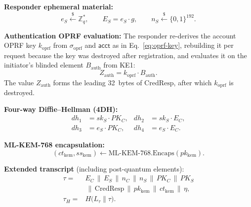 \documentclass{ieeeijc}
\newcommand{\acct}{\mathsf{acct}}
\newcommand{\sigoprf}{\sigma_{\mathrm{oprf}}}
\theoremstyle{remark}
\begin{document}
\textbf{Responder ephemeral material:}
\begin{equation}
  e_S \xleftarrow{\$} \mathbb{Z}_q^*,\qquad
  E_S = e_S \cdot g,\qquad
  n_S \xleftarrow{\$} \{0,1\}^{192}.
\end{equation}

\textbf{Authentication OPRF evaluation:} The responder re-derives the
account OPRF key $k_{\mathrm{oprf}}$ from $\sigoprf$ and $\acct$ as in
Eq.~\eqref{eq:oprf-key}, rebuilding it per request because the key was
destroyed after registration, and evaluates it on the initiator's
blinded element $B_{\mathrm{auth}}$ from KE1:
\begin{equation}
  Z_{\mathrm{auth}} = k_{\mathrm{oprf}} \cdot B_{\mathrm{auth}}.
\end{equation}
The value $Z_{\mathrm{auth}}$ forms the leading 32~bytes of
$\mathrm{CredResp}$, after which $k_{\mathrm{oprf}}$ is destroyed.

\textbf{Four-way Diffie--Hellman (4DH):}
\begin{equation}
  \begin{aligned}
    dh_1 &= sk_S \cdot PK_C, &
    dh_2 &= sk_S \cdot E_C,\\
    dh_3 &= e_S \cdot PK_C, &
    dh_4 &= e_S \cdot E_C.
  \end{aligned}
\end{equation}

\textbf{ML-KEM-768 encapsulation:}
\begin{equation}
  (ct_{\mathrm{kem}}, ss_{\mathrm{kem}})
    \leftarrow \mathrm{ML\text{-}KEM\text{-}768.Encaps}(pk_{\mathrm{kem}}).
\end{equation}

\textbf{Extended transcript} (including post-quantum elements):
\begin{equation}
  \begin{aligned}
    \tau ={}& E_C \,\|\, E_S \,\|\, n_C \,\|\, n_S
      \,\|\, PK_C \,\|\, PK_S\\
      &{}\,\|\, \mathrm{CredResp} \,\|\, pk_{\mathrm{kem}}
      \,\|\, ct_{\mathrm{kem}} \,\|\, \eta,\\
    \tau_H ={}& H\!\bigl(L_{\tau} \| \tau\bigr).
  \end{aligned}
  \label{eq:hybrid-transcript}
\end{equation}
\end{document}
